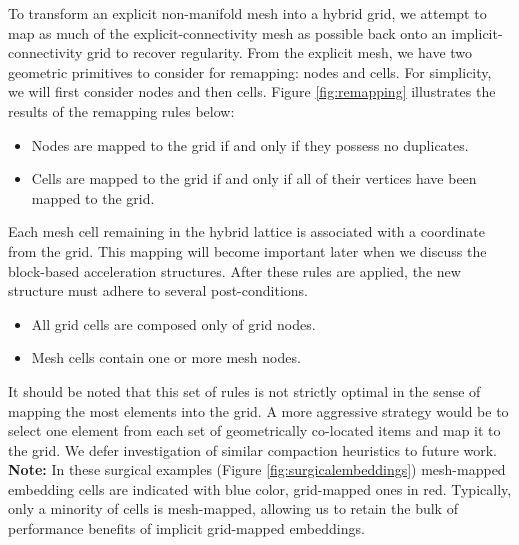 To transform an explicit non-manifold mesh into a hybrid grid, we
attempt to map as much of the explicit-connectivity mesh as possible
back onto an implicit-connectivity grid to recover regularity. From
the explicit mesh, we have two geometric primitives to consider for
remapping: nodes and cells. For simplicity, we will first consider
nodes and then cells. Figure \ref{fig:remapping} illustrates the
results of the remapping rules below:
\begin{itemize}
\vspace*{-.05in}\item Nodes are mapped to the grid if and only if they possess no duplicates.
\vspace*{-.05in}\item Cells are mapped to the grid if and only if all of their vertices have been mapped to the grid.
\end{itemize}
\vspace*{-.05in} Each mesh cell remaining in the hybrid lattice is
associated with a coordinate from the grid. This mapping will become
important later when we discuss the block-based acceleration
structures.  After these rules are applied, the new structure must
adhere to several post-conditions.
\begin{itemize}
\vspace*{-.05in}\item All grid cells are composed only of grid nodes.
\vspace*{-.05in}\item Mesh cells contain one or more mesh nodes.
\end{itemize}
It should be noted that this set of rules is not strictly optimal in
the sense of mapping the most elements into the grid. A more
aggressive strategy would be to select one element from each set of
geometrically co-located items and map it to the grid. We defer
investigation of similar compaction heuristics to future work.
\textbf{Note:} In these surgical examples (Figure \ref{fig:surgicalembeddings}) mesh-mapped embedding cells are indicated
with blue color, grid-mapped ones in red. Typically, only a minority
of cells is mesh-mapped, allowing us to retain the bulk of performance
benefits of implicit grid-mapped embeddings.



